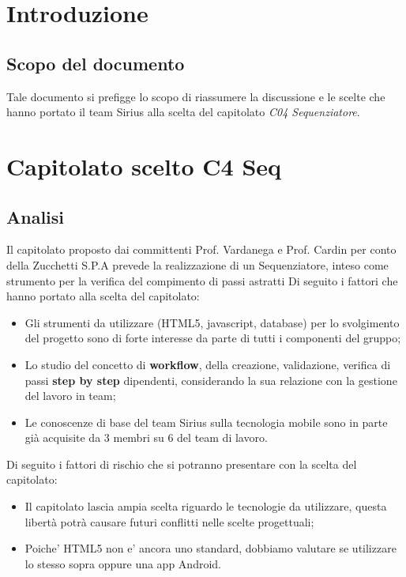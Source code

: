 
\section{Introduzione}
\subsection{Scopo del documento}
Tale documento si prefigge lo scopo di riassumere la discussione e le scelte che hanno portato il team Sirius alla scelta del capitolato \textit{C04 Sequenziatore}.\\

\section{Capitolato scelto C4 Seq}
\subsection{Analisi}
Il capitolato proposto dai committenti Prof. Vardanega e Prof. Cardin per conto della Zucchetti S.P.A prevede la realizzazione di un Sequenziatore, inteso come strumento per la verifica del compimento di passi astratti
Di seguito i fattori che hanno portato alla scelta del capitolato:
\begin{itemize}
\item Gli strumenti da utilizzare (HTML5, javascript, database) per lo svolgimento del progetto sono di forte interesse da parte di tutti i componenti del gruppo;
\item Lo studio del concetto di \textbf{workflow}, della creazione, validazione, verifica di passi \textbf{step by step} dipendenti, considerando la sua relazione con la gestione del lavoro in team;
\item Le conoscenze di base del team Sirius sulla tecnologia mobile sono in parte già acquisite da 3 membri su 6 del team di lavoro.
\end{itemize}
Di seguito i fattori di rischio che si potranno presentare con la scelta del capitolato:
\begin{itemize}
\item Il capitolato lascia ampia scelta riguardo le tecnologie da utilizzare, questa libertà potrà causare futuri conflitti nelle scelte progettuali;
\item Poiche' HTML5 non e' ancora uno standard, dobbiamo valutare se utilizzare lo stesso sopra oppure una app Android.
\end{itemize}
